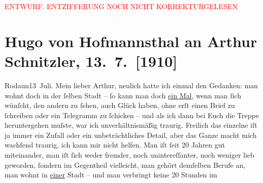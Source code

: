 
\begin{center}
            \textcolor{red}{ENTWURF. ENTZIFFERUNG NOCH NICHT KORREKTURGELESEN}
                      \end{center}
            
               \section[Hugo von Hofmannsthal an Arthur Schnitzler, 13. 7. {[}1910{]}]{ Hugo von Hofmannsthal an Arthur Schnitzler, 13. 7. {[}1910{]}}\nopagebreak{}\rehead{ }\begin{ledgroupsized}[t]{13cm}\normalsize\beginnumbering{} \toendnotes[C]{\smallbreak\pagebreak[2]} 
\toendnotes[C]{\smallbreak}\pstart
           \raggedleft{}{\pb}Rodaun13 Juli.\pend
           \pstart{}Mein lieber Arthur, \pend\pstart
           neulich hatte ich einmal den Gedanken: man wohnt doch in der ſelben Stadt – ſo kann
               man doch \uline{ein Mal}, wenn man ſich wünſcht, den andern
               zu ſehen, auch Glück haben, ohne erſt einen Brief zu ſchreiben oder ein Telegramm zu
               ſchicken – und als ich dann bei Euch die Treppe heruntergehen {\pb}muſste, war ich unverhältnismäßig
               traurig. Freilich das einzelne iſt ja immer ein Zufall oder ein unbeträchtliches
               Detail, aber das Ganze macht mich wachſend traurig, ich kann mir nicht helfen. Man
               iſt ſeit 20 Jahren gut miteinander, man iſt ſich weder fremder, noch unintereſſanter,
               noch weniger lieb geworden, {\pb}ſondern im Gegentheil vielleicht, man gehört demſelben Berufe an, man wohnt in \uline{einer} Stadt – und man verbringt keine 20 Stunden im

\end{ledgroupsized}
